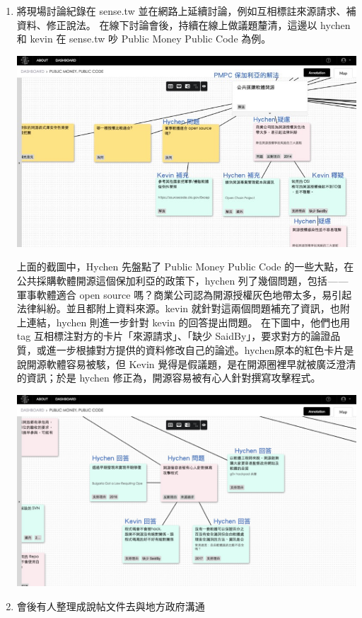\documentclass[12pt,a4paper]{article}
\begin{document}
\begin{enumerate}
\begin{enumerate}
\item 將現場討論紀錄在 sense.tw 並在網路上延續討論，例如互相標註來源請求、補資料、修正說法。
在線下討論會後，持續在線上做議題釐清，這邊以 hychen 和 kevin 在 sense.tw 吵 Public Money Public Code 為例。
\begin{center}
\includegraphics[width=.9\linewidth]{./images/pmpc-hychen-kevin1.jpg}
\end{center}
上面的截圖中，Hychen 先盤點了 Public Money Public Code 的一些大點，在公共採購軟體開源這個保加利亞的政策下，hychen 列了幾個問題，包括 — — 軍事軟體適合 open source 嗎？商業公司認為開源授權灰色地帶太多，易引起法律糾紛。並且都附上資料來源。kevin 就針對這兩個問題補充了資訊，也附上連結，hychen 則進一步針對 kevin 的回答提出問題。
在下圖中，他們也用 tag 互相標注對方的卡片「來源請求」、「缺少 SaidBy」，要求對方的論證品質，或進一步根據對方提供的資料修改自己的論述。hychen原本的紅色卡片是說開源軟體容易被駭，但 Kevin 覺得是假議題，是在開源圈裡早就被廣泛澄清的資訊；於是 hychen 修正為，開源容易被有心人針對撰寫攻擊程式。
\begin{center}
\includegraphics[width=.9\linewidth]{./images/pmpc-hychen-kevin2.jpg}
\end{center}

\item 會後有人整理成說帖文件去與地方政府溝通
\end{enumerate}


\end{enumerate}
\end{document}
